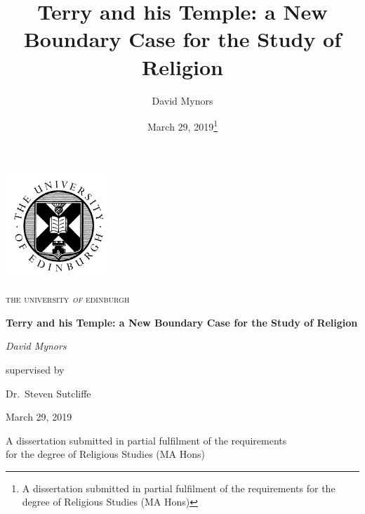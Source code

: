 \documentclass[a4paper]{report}
\title{Terry and his Temple: a New Boundary Case for the Study of Religion}
\author{David Mynors}
\date{March 29, 2019\thanks{A dissertation submitted in partial fulfilment of the requirements for the degree of Religious Studies (MA Hons)}}
\begin{document}
\begin{titlepage}
	\centering
	\includegraphics[width=0.30\textwidth]{uoe.png}\par\vspace{0.25cm}
{\scshape\LARGE the university {\Large\textit{of}} edinburgh \par}
	\vspace{1.5cm}
	{\LARGE\bfseries Terry and his Temple: a New Boundary Case for the Study of Religion\par}
	\vspace{1.5cm}
	{\Large\itshape David Mynors\par}
	\vspace{1.5cm}
  supervised by\par
  Dr.~Steven Sutcliffe


  \vfill

	{\large March 29, 2019\par}
	\vspace{1cm}
	A dissertation submitted in partial fulfilment of the requirements\\
  for the degree of Religious Studies (MA Hons)\par
\end{titlepage}
\tableofcontents
\thispagestyle{empty}
\clearpage
{}





\printbibliography[
heading=bibintoc,
title={Bibliography}
]
\end{document}
